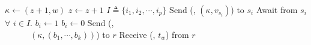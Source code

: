\begin{algorithm}[!h]
	\begin{algorithmic}[2]
		\begin{multicols}{2}{\footnotesize
				\EndPart
				\Statex\Statex
				{\bf  {}}
				\Part{ \underline{\writeValue}} {
					\State ${\kappa} \leftarrow (z +1,  w)$
					\State $z \leftarrow z +1 $
					\State $I\triangleq \{i_1, i_2, \cdots, i_p \}$
					\State Send (\writeValueTag, $({\kappa}, v_{s_i})$) to  $s_i$
					\EndFor 
					\State  Await {\ackTag}  from  $s_i$ $\forall$ $i \in I$.
				}\EndPart
				\Statex
				\Part{ \underline{\informReader}} {
					\State $b_i \leftarrow 1$
					\Else
					\State $b_i \leftarrow 0$
					\EndIf
					\EndFor 
					\State  Send  (\informReaderTag,
					 \\~~~~~~$({\kappa}, (b_{1}, \cdots, b_{k}))$) to   $r$
					\State  Receive ({\ackTag}, $t_w$) from  $r$
				}\EndPart
		}\end{multicols}	
		\vspace{-1.5em} 
		\\\hrulefill 	
		\vspace{-1.5em}
		\begin{multicols}{2}{\footnotesize	
				\EndPart
				
}
\end{multicols}
\end{algorithmic}
\end{algorithm}
